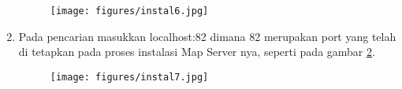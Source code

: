 \begin{enumerate}
    \begin{figure}[!htbp]
    \centering
    \texttt{[image: figures/instal6.jpg]}
    \label{instal6}
\end{figure}    
    \item Pada pencarian masukkan localhost:82 dimana 82 merupakan port yang telah di tetapkan pada proses instalasi Map Server nya, seperti pada gambar \ref{instal7}. 
    \begin{figure}[!htbp]
    \centering
    \texttt{[image: figures/instal7.jpg]}
    \label{instal7}
\end{figure}  

\end{enumerate}

